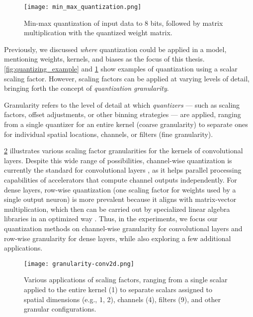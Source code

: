 \begin{figure}[t!]
  \centering
  \texttt{[image: min\_max\_quantization.png]}
  \caption{ Min-max quantization of input data to 8 bits, followed by matrix multiplication with the quantized weight matrix.}
  \label{fig:min_max_quantization}
\end{figure}

Previously, we discussed \textit{where} quantization could be applied in a model, 
mentioning weights, kernels, and biases as the focus of this thesis.
\cref{fig:quantizing_example} and \cref{fig:min_max_quantization} show examples of quantization
using a scalar scaling factor. 
However, scaling factors can be applied at varying levels of detail,
bringing forth the concept of \textit{quantization granularity}.

Granularity refers to the level of detail at which \textit{quantizers} — such as scaling factors, offset adjustments, or other binning strategies 
— are applied,
ranging from a single quantizer for an entire kernel (coarse granularity) to separate ones for individual spatial locations,
channels, or filters (fine granularity). 

\cref{fig:granularity-conv2d} illustrates various scaling factor granularities
for the kernels of convolutional layers.
Despite this wide range of possibilities, channel-wise quantization is currently the standard for convolutional layers \cite{gholami2021survey},
as it helps parallel processing capabilities of accelerators that compute channel outputs independently. 
For dense layers, row-wise quantization (one scaling factor for weights used by a single output neuron) is more prevalent
because it aligns with matrix-vector multiplication, which then can be carried out by specialized linear algebra libraries
in an optimized way \cite{DBLP:journals/corr/abs-2101-05615}.
Thus, in the experiments, we focus our quantization methods on channel-wise granularity for convolutional layers
and row-wise granularity for dense layers, 
while also exploring a few additional applications.

\begin{figure}[t!]
  \centering
  \texttt{[image: granularity-conv2d.png]}
  \caption{Various applications of scaling factors, ranging from a single scalar applied to the entire kernel (1) to separate scalars assigned to spatial dimensions (e.g., 1, 2), channels (4), filters (9), and other granular configurations.}
  \label{fig:granularity-conv2d}
\end{figure}



